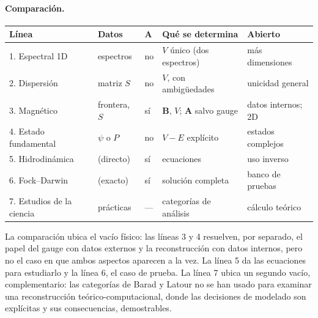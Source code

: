 \documentclass[12pt,letterpaper]{article}
\newcommand{\Av}{\mathbf{A}}
\newcommand{\Bv}{\mathbf{B}}
\begin{document}
\paragraph{Comparación.}
\begin{center}
\begin{tabular}{@{}p{3.1cm} p{2.6cm} p{1.6cm} p{3.6cm} p{3.2cm}@{}}
\toprule
\textbf{Línea} & \textbf{Datos} & \textbf{$\Av$} & \textbf{Qué se determina} & \textbf{Abierto} \\
\midrule
1. Espectral 1D & espectros & no & $V$ único (dos espectros) & más dimensiones \\
2. Dispersión & matriz $S$ & no & $V$, con ambigüedades & unicidad general \\
3. Magnético & frontera, $S$ & sí & $\Bv$, $V$; $\Av$ salvo gauge & datos internos; 2D \\
4. Estado fundamental & $\psi$ o $P$ & no & $V-E$ explícito & estados complejos \\
5. Hidrodinámica & (directo) & sí & ecuaciones & uso inverso \\
6. Fock--Darwin & (exacto) & sí & solución completa & banco de pruebas \\
7. Estudios de la ciencia & prácticas & --- & categorías de análisis & cálculo teórico \\
\bottomrule
\end{tabular}
\end{center}
La comparación ubica el vacío físico: las líneas 3 y 4 resuelven, por separado, el papel del gauge con datos externos y la
reconstrucción con datos internos, pero no el caso en que ambos aspectos aparecen a la vez. La línea 5 da las ecuaciones
para estudiarlo y la línea 6, el caso de prueba. La línea 7 ubica un segundo vacío, complementario: las categorías de
Barad y Latour no se han usado para examinar una reconstrucción teórico-computacional, donde las decisiones de modelado
son explícitas y sus consecuencias, demostrables.
\end{document}
